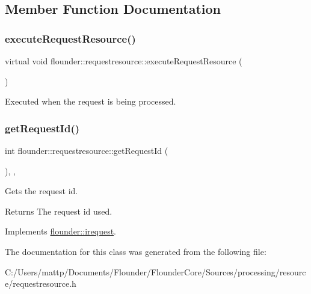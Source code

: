 \subsection{Member Function Documentation}
\mbox{\label{classflounder_1_1requestresource_a041468425259aa834e7b969ae3f75d5a}} 
\subsubsection{\texorpdfstring{execute\+Request\+Resource()}{executeRequestResource()}}
{\footnotesize\ttfamily virtual void flounder\+::requestresource\+::execute\+Request\+Resource (\begin{DoxyParamCaption}{ }\end{DoxyParamCaption})\hspace{0.3cm}{\ttfamily [pure virtual]}}



Executed when the request is being processed. 

\mbox{\label{classflounder_1_1requestresource_a4c46533325ddc35a1b89e4af418ea77e}} 
\subsubsection{\texorpdfstring{get\+Request\+Id()}{getRequestId()}}
{\footnotesize\ttfamily int flounder\+::requestresource\+::get\+Request\+Id (\begin{DoxyParamCaption}{ }\end{DoxyParamCaption})\hspace{0.3cm}{\ttfamily [inline]}, {\ttfamily [override]}, {\ttfamily [virtual]}}



Gets the request id. 

\begin{DoxyReturn}{Returns}
The request id used. 
\end{DoxyReturn}


Implements \hyperlink{classflounder_1_1irequest_a69e6b820c6635486e488e6aa18b11730}{flounder\+::irequest}.



The documentation for this class was generated from the following file\+:\begin{DoxyCompactItemize}
\item 
C\+:/\+Users/mattp/\+Documents/\+Flounder/\+Flounder\+Core/\+Sources/processing/resource/requestresource.\+h\end{DoxyCompactItemize}

